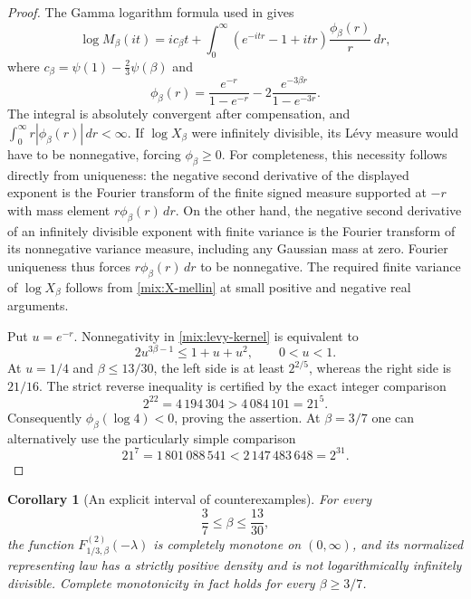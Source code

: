 \documentclass[11pt,a4paper]{article}
\numberwithin{equation}{section}
\newtheorem{corollary}[theorem]{Corollary}
\theoremstyle{definition}\newtheorem{definition}[theorem]{Definition}
\theoremstyle{remark}\newtheorem{remark}[theorem]{Remark}
\begin{document}
\begin{proof}
The Gamma logarithm formula used in \cite[Section~2]{Simon} gives
\[
 \log M_\beta(it)=ic_\beta t
       +\int_0^\infty
          (e^{-itr}-1+itr)\frac{\phi_\beta(r)}{r}\,dr,
\]
where \(c_\beta=\psi(1)-\frac23\psi(\beta)\) and
\begin{equation}\label{mix:levy-kernel}
 \phi_\beta(r)=\frac{e^{-r}}{1-e^{-r}}
                   -2\frac{e^{-3\beta r}}{1-e^{-3r}}.
\end{equation}
The integral is absolutely convergent after compensation, and
\(\int_0^\infty r|\phi_\beta(r)|\,dr<\infty\).
If \(\log X_\beta\) were infinitely divisible, its L\'evy measure
would have to be nonnegative, forcing \(\phi_\beta\ge0\).
For completeness, this necessity follows directly from uniqueness:
the negative second derivative of the displayed exponent is the
Fourier transform of the finite signed measure supported at \(-r\)
with mass element \(r\phi_\beta(r)\,dr\).  On the other hand, the
negative second derivative of an infinitely divisible exponent with
finite variance is the Fourier transform of its nonnegative
variance measure, including any Gaussian mass at zero.  Fourier
uniqueness thus forces \(r\phi_\beta(r)\,dr\) to be nonnegative.
The required finite variance of \(\log X_\beta\) follows from
\eqref{mix:X-mellin} at small positive and negative real arguments.

Put \(u=e^{-r}\).  Nonnegativity in
\eqref{mix:levy-kernel} is equivalent to
\begin{equation}\label{mix:scalar-id-condition}
                 2u^{3\beta-1}\le1+u+u^2,
                         \qquad 0<u<1.
\end{equation}
At \(u=1/4\) and \(\beta\le13/30\), the left side is at least
\(2^{2/5}\), whereas the right side is \(21/16\).  The strict
reverse inequality is certified by the exact integer comparison
\[
           2^{22}=4\,194\,304
                      >4\,084\,101=21^5.
\]
Consequently \(\phi_\beta(\log4)<0\), proving the assertion.
At \(\beta=3/7\) one can alternatively use the particularly simple
comparison
\[
          21^7=1\,801\,088\,541
                     <2\,147\,483\,648=2^{31}.
\]
\end{proof}

\begin{corollary}[An explicit interval of counterexamples]
\label{mix:explicit-family}
For every
\[
                     \frac37\le\beta\le\frac{13}{30},
\]
the function \(F^{(2)}_{1/3,\beta}(-\lambda)\) is completely
monotone on \((0,\infty)\), and its normalized representing law
has a strictly positive density and is not logarithmically infinitely
divisible.  Complete monotonicity in fact holds for every
\(\beta\ge3/7\).
\end{corollary}
\end{document}
